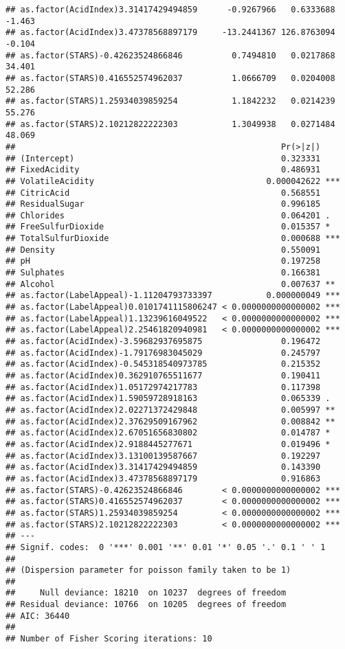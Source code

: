 \documentclass[
]{article}
\begin{document}
\begin{verbatim}
## as.factor(AcidIndex)3.31417429494859      -0.9267966   0.6333688  -1.463
## as.factor(AcidIndex)3.47378568897179     -13.2441367 126.8763094  -0.104
## as.factor(STARS)-0.42623524866846          0.7494810   0.0217868  34.401
## as.factor(STARS)0.416552574962037          1.0666709   0.0204008  52.286
## as.factor(STARS)1.25934039859254           1.1842232   0.0214239  55.276
## as.factor(STARS)2.10212822222303           1.3049938   0.0271484  48.069
##                                                      Pr(>|z|)    
## (Intercept)                                          0.323331    
## FixedAcidity                                         0.486931    
## VolatileAcidity                                   0.000042622 ***
## CitricAcid                                           0.568551    
## ResidualSugar                                        0.996185    
## Chlorides                                            0.064201 .  
## FreeSulfurDioxide                                    0.015357 *  
## TotalSulfurDioxide                                   0.000688 ***
## Density                                              0.550091    
## pH                                                   0.197258    
## Sulphates                                            0.166381    
## Alcohol                                              0.007637 ** 
## as.factor(LabelAppeal)-1.11204793733397           0.000000049 ***
## as.factor(LabelAppeal)0.0101741115806247 < 0.0000000000000002 ***
## as.factor(LabelAppeal)1.13239616049522   < 0.0000000000000002 ***
## as.factor(LabelAppeal)2.25461820940981   < 0.0000000000000002 ***
## as.factor(AcidIndex)-3.59682937695875                0.196472    
## as.factor(AcidIndex)-1.79176983045029                0.245797    
## as.factor(AcidIndex)-0.545318540973785               0.215352    
## as.factor(AcidIndex)0.362910765511677                0.190411    
## as.factor(AcidIndex)1.05172974217783                 0.117398    
## as.factor(AcidIndex)1.59059728918163                 0.065339 .  
## as.factor(AcidIndex)2.02271372429848                 0.005997 ** 
## as.factor(AcidIndex)2.37629509167962                 0.008842 ** 
## as.factor(AcidIndex)2.67051656830802                 0.014787 *  
## as.factor(AcidIndex)2.9188445277671                  0.019496 *  
## as.factor(AcidIndex)3.13100139587667                 0.192297    
## as.factor(AcidIndex)3.31417429494859                 0.143390    
## as.factor(AcidIndex)3.47378568897179                 0.916863    
## as.factor(STARS)-0.42623524866846        < 0.0000000000000002 ***
## as.factor(STARS)0.416552574962037        < 0.0000000000000002 ***
## as.factor(STARS)1.25934039859254         < 0.0000000000000002 ***
## as.factor(STARS)2.10212822222303         < 0.0000000000000002 ***
## ---
## Signif. codes:  0 '***' 0.001 '**' 0.01 '*' 0.05 '.' 0.1 ' ' 1
## 
## (Dispersion parameter for poisson family taken to be 1)
## 
##     Null deviance: 18210  on 10237  degrees of freedom
## Residual deviance: 10766  on 10205  degrees of freedom
## AIC: 36440
## 
## Number of Fisher Scoring iterations: 10
\end{verbatim}
\end{document}
